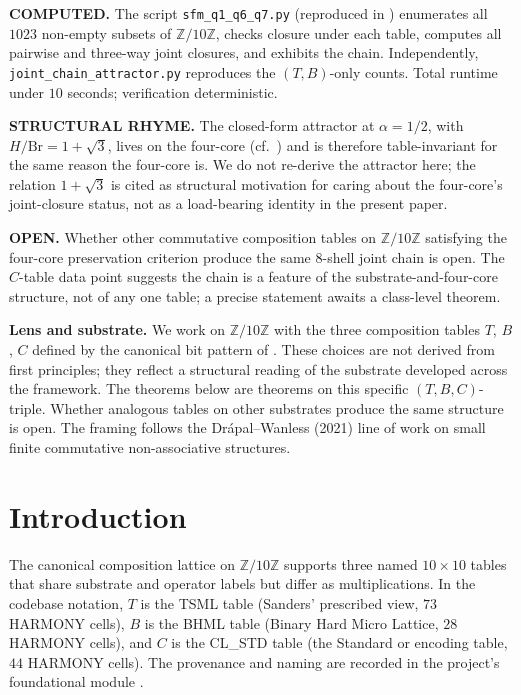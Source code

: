 \documentclass[11pt,reqno]{amsart}
\theoremstyle{definition}
\newcommand{\Z}{\mathbb{Z}}
\begin{document}
\textbf{COMPUTED.} The script \texttt{sfm\_q1\_q6\_q7.py}
(reproduced in \cite{SFM2026}) enumerates all $1023$ non-empty
subsets of $\Z/10\Z$, checks closure under each table, computes
all pairwise and three-way joint closures, and exhibits the
chain. Independently, \texttt{joint\_chain\_attractor.py}
\cite{Gen13WP115} reproduces the $(T,B)$-only counts. Total
runtime under $10$ seconds; verification deterministic.

\textbf{STRUCTURAL RHYME.} The closed-form attractor at
$\alpha=1/2$, with $H/\mathrm{Br}=1+\sqrt{3}$, lives on the
four-core (cf.~\cite{Sanders2026FourCore}) and is therefore
table-invariant for the same reason the four-core is. We do not
re-derive the attractor here; the relation $1+\sqrt{3}$ is cited
as structural motivation for caring about the four-core's
joint-closure status, not as a load-bearing identity in the
present paper.

\textbf{OPEN.} Whether other commutative composition tables on
$\Z/10\Z$ satisfying the four-core preservation criterion produce
the same $8$-shell joint chain is open. The $C$-table data point
suggests the chain is a feature of the substrate-and-four-core
structure, not of any one table; a precise statement awaits a
class-level theorem.

\textbf{Lens and substrate.} We work on $\Z/10\Z$ with the three
composition tables $T$, $B$, $C$ defined by the canonical bit
pattern of \cite{Sanders2026CLAxioms}. These choices are not
derived from first principles; they reflect a structural reading
of the substrate developed across the framework. The theorems
below are theorems on this specific $(T,B,C)$-triple. Whether
analogous tables on other substrates produce the same structure
is open. The framing follows the Drápal–Wanless (2021) line of
work \cite{DrapalWanless2021} on small finite commutative
non-associative structures.

\section{Introduction}
\label{sec:intro}

The canonical composition lattice on $\Z/10\Z$ supports three
named $10\times 10$ tables that share substrate and operator
labels but differ as multiplications. In the codebase notation,
$T$ is the TSML table (Sanders' prescribed view, $73$ HARMONY
cells), $B$ is the BHML table (Binary Hard Micro Lattice, $28$
HARMONY cells), and $C$ is the CL\_STD table (the Standard or
encoding table, $44$ HARMONY cells). The provenance and naming
are recorded in the project's foundational module
\cite{Gen13Foundations}.
\end{document}
